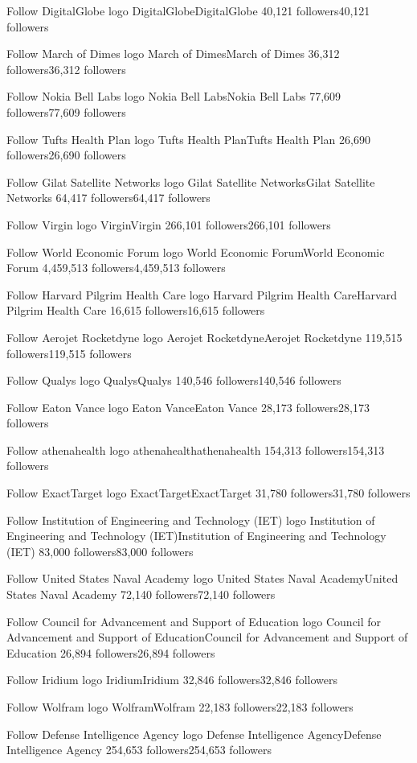 Follow
DigitalGlobe logo
DigitalGlobeDigitalGlobe
40,121 followers40,121 followers

Follow
March of Dimes logo
March of DimesMarch of Dimes
36,312 followers36,312 followers

Follow
Nokia Bell Labs logo
Nokia Bell LabsNokia Bell Labs
77,609 followers77,609 followers

Follow
Tufts Health Plan logo
Tufts Health PlanTufts Health Plan
26,690 followers26,690 followers

Follow
Gilat Satellite Networks logo
Gilat Satellite NetworksGilat Satellite Networks
64,417 followers64,417 followers

Follow
Virgin logo
VirginVirgin
266,101 followers266,101 followers

Follow
World Economic Forum logo
World Economic ForumWorld Economic Forum
4,459,513 followers4,459,513 followers

Follow
Harvard Pilgrim Health Care logo
Harvard Pilgrim Health CareHarvard Pilgrim Health Care
16,615 followers16,615 followers

Follow
Aerojet Rocketdyne logo
Aerojet RocketdyneAerojet Rocketdyne
119,515 followers119,515 followers

Follow
Qualys logo
QualysQualys
140,546 followers140,546 followers

Follow
Eaton Vance logo
Eaton VanceEaton Vance
28,173 followers28,173 followers

Follow
athenahealth logo
athenahealthathenahealth
154,313 followers154,313 followers

Follow
ExactTarget logo
ExactTargetExactTarget
31,780 followers31,780 followers

Follow
Institution of Engineering and Technology (IET) logo
Institution of Engineering and Technology (IET)Institution of Engineering and Technology (IET)
83,000 followers83,000 followers

Follow
United States Naval Academy logo
United States Naval AcademyUnited States Naval Academy
72,140 followers72,140 followers

Follow
Council for Advancement and Support of Education logo
Council for Advancement and Support of EducationCouncil for Advancement and Support of Education
26,894 followers26,894 followers

Follow
Iridium logo
IridiumIridium
32,846 followers32,846 followers

Follow
Wolfram logo
WolframWolfram
22,183 followers22,183 followers

Follow
Defense Intelligence Agency logo
Defense Intelligence AgencyDefense Intelligence Agency
254,653 followers254,653 followers

